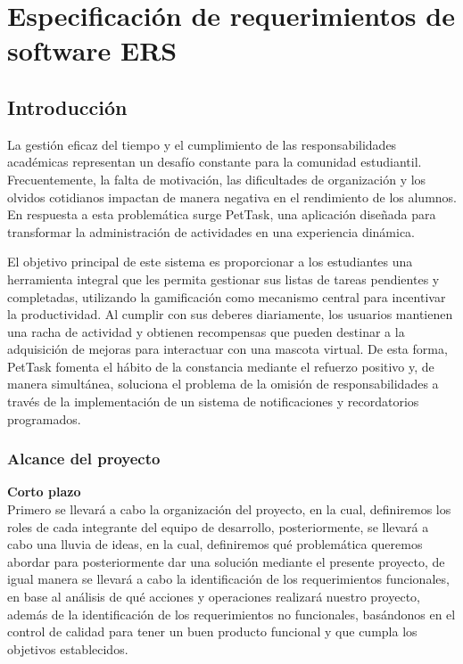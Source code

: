 \documentclass[12pt,letterpaper]{article}
\begin{document}
\newpage

\tableofcontents
\newpage

\section{Especificación de requerimientos de software ERS}

\subsection{Introducción}
La gestión eficaz del tiempo y el cumplimiento de las responsabilidades académicas representan un desafío constante para la comunidad estudiantil. Frecuentemente, la falta de motivación, las dificultades de organización y los olvidos cotidianos impactan de manera negativa en el rendimiento de los alumnos. En respuesta a esta problemática surge PetTask, una aplicación diseñada para transformar la administración de actividades en una experiencia dinámica.

El objetivo principal de este sistema es proporcionar a los estudiantes una herramienta integral que les permita gestionar sus listas de tareas pendientes y completadas, utilizando la gamificación como mecanismo central para incentivar la productividad. Al cumplir con sus deberes diariamente, los usuarios mantienen una racha de actividad y obtienen recompensas que pueden destinar a la adquisición de mejoras para interactuar con una mascota virtual. De esta forma, PetTask fomenta el hábito de la constancia mediante el refuerzo positivo y, de manera simultánea, soluciona el problema de la omisión de responsabilidades a través de la implementación de un sistema de notificaciones y recordatorios programados.
\newpage
\subsubsection{Alcance del proyecto}
\textbf{Corto plazo} \\
Primero se llevará a cabo la organización del proyecto, en la cual, definiremos los roles de cada integrante del equipo de desarrollo, posteriormente, se llevará a cabo una lluvia de ideas, en la cual, definiremos qué problemática queremos abordar para posteriormente dar una solución mediante el presente proyecto, de igual manera se llevará a cabo la identificación de los requerimientos funcionales, en base al análisis de qué acciones y operaciones realizará nuestro proyecto, además de la identificación de los requerimientos no funcionales, basándonos en el control de calidad para tener un buen producto funcional y que cumpla los objetivos establecidos.
\end{document}
